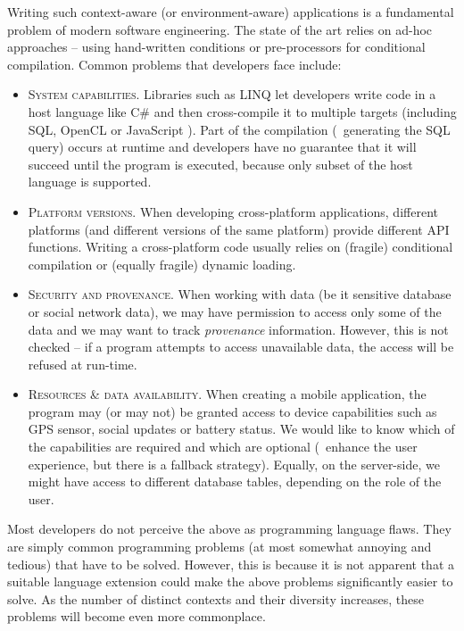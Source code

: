 Writing such context-aware (or environment-aware) applications is a fundamental problem of modern
software engineering. The state of the art relies on ad-hoc approaches -- using hand-written conditions
or pre-processors for conditional compilation. Common problems that developers face include:

\begin{itemize}
\item \textsc{System capabilities.} Libraries such as LINQ \cite{app-linq} let developers write code
  in a host language like C\# and then cross-compile it to multiple targets (including SQL, OpenCL 
  or JavaScript \cite{app-hop-lang}). Part of the compilation (\eg~generating the SQL query) occurs 
  at runtime and developers have no guarantee that it will succeed until the program is executed,
  because only subset of the host language is supported.

\item \textsc{Platform versions.} When developing cross-platform applications, different platforms
  (and different versions of the same platform) provide different API functions. Writing a
  cross-platform code usually relies on (fragile) conditional compilation or (equally fragile)
  dynamic loading.

\item \textsc{Security and provenance.} When working with data (be it sensitive database or social
   network data), we may have permission to access only some of the data and we may want to track
   \emph{provenance} information. However, this is not checked -- if a program attempts to access
   unavailable data, the access will be refused at run-time.

\item \textsc{Resources \& data availability.} When creating a mobile application, the program may
  (or may not) be granted access to device capabilities such as GPS sensor, social updates or battery
  status. We would like to know which of the capabilities are required and which are optional
  (\ie~enhance the user experience, but there is a fallback strategy). Equally, on the server-side,
  we might have access to different database tables, depending on the role of the user.
\end{itemize}

\noindent
Most developers do not perceive the above as programming language flaws. They are simply common
programming problems (at most somewhat annoying and tedious) that have to be solved. However, this
is because it is not apparent that a suitable language extension could make the above problems
significantly easier to solve. As the number of distinct contexts and their diversity increases,
these problems will become even more commonplace.

